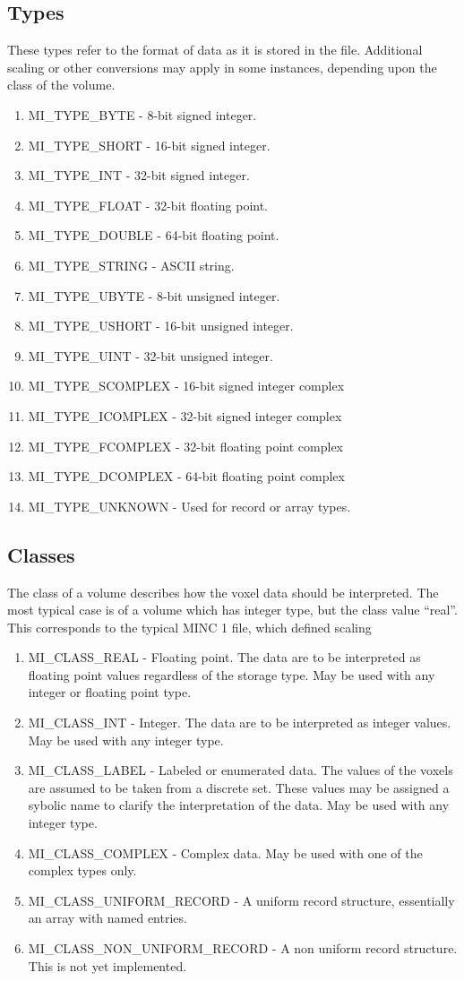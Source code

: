 \documentclass{article}
\begin{document}
\subsection{Types}
These types refer to the format of data as it is stored in the file.
Additional scaling or other conversions may apply in some instances, 
depending upon the class of the volume.
\begin{enumerate}
\item MI\_TYPE\_BYTE - 8-bit signed integer.
\item MI\_TYPE\_SHORT - 16-bit signed integer.
\item MI\_TYPE\_INT - 32-bit signed integer.
\item MI\_TYPE\_FLOAT - 32-bit floating point.
\item MI\_TYPE\_DOUBLE - 64-bit floating point.
\item MI\_TYPE\_STRING - ASCII string.
\item MI\_TYPE\_UBYTE - 8-bit unsigned integer.
\item MI\_TYPE\_USHORT - 16-bit unsigned integer.
\item MI\_TYPE\_UINT - 32-bit unsigned integer.
\item MI\_TYPE\_SCOMPLEX - 16-bit signed integer complex
\item MI\_TYPE\_ICOMPLEX - 32-bit signed integer complex
\item MI\_TYPE\_FCOMPLEX - 32-bit floating point complex
\item MI\_TYPE\_DCOMPLEX - 64-bit floating point complex
\item MI\_TYPE\_UNKNOWN - Used for record or array types.
\end{enumerate}
\subsection{Classes}
The class of a volume describes how the voxel data should be interpreted.
The most typical case is of a volume which has integer type, but the class
value ``real''.  This corresponds to the typical MINC 1 file, which defined
scaling
\begin{enumerate}
\item MI\_CLASS\_REAL - Floating point.  The data are to be
interpreted as floating point values regardless of the storage type.
May be used with any integer or floating point type.
\item MI\_CLASS\_INT - Integer.  The data are to be interpreted as integer
values.  May be used with any integer type.
\item MI\_CLASS\_LABEL - Labeled or enumerated data.  The values of
the voxels are assumed to be taken from a discrete set.  These values
may be assigned a sybolic name to clarify the interpretation of the
data.  May be used with any integer type.
\item MI\_CLASS\_COMPLEX - Complex data.  May be used with one of the
complex types only.
\item MI\_CLASS\_UNIFORM\_RECORD - A uniform record structure, essentially an
array with named entries.
\item MI\_CLASS\_NON\_UNIFORM\_RECORD - A non uniform record structure.  This
is not yet implemented.
\end{enumerate}
\end{document}
